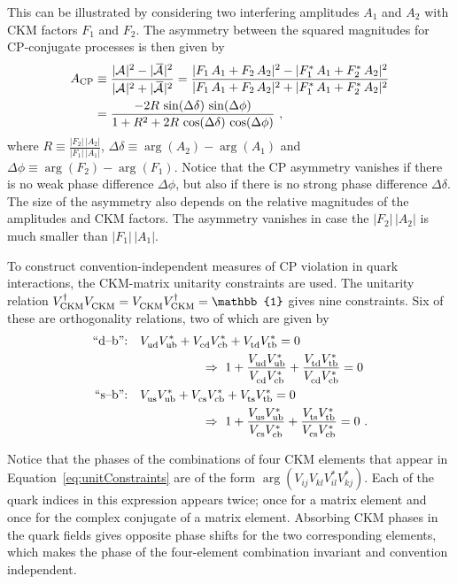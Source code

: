 This can be illustrated by considering two interfering amplitudes $A_1$ and $A_2$ with CKM factors $F_1$ and $F_2$. The asymmetry between
the squared magnitudes for CP-conjugate processes is then given by
\begin{equation}
  \label{eq:interference}
  \begin{split}
    A_\text{CP} &\equiv \frac{|\Af[]|^2 - |\Abarf[]|^2}{|\Af[]|^2 + |\Abarf[]|^2}
                 = \frac{|F_1\,A_1 + F_2\,A_2|^2 - |F_1^*\,A_1 + F_2^*\,A_2|^2}{|F_1\,A_1 + F_2\,A_2|^2 + |F_1^*\,A_1 + F_2^*\,A_2|^2} \\
                &= \frac{-2 R\, \sin(\Delta\delta)\, \sin(\Delta\phi)}{1 + R^2 + 2 R\, \cos(\Delta\delta)\, \cos(\Delta\phi)}
                   \ ,
  \end{split}
\end{equation}
where $R\equiv\frac{|F_2|\,|A_2|}{|F_1|\,|A_1|}$, $\Delta\delta\equiv\arg(A_2)-\arg(A_1)$ and $\Delta\phi\equiv\arg(F_2)-\arg(F_1)$. Notice
that the CP asymmetry vanishes if there is no weak phase difference $\Delta\phi$, but also if there is no strong phase difference
$\Delta\delta$. The size of the asymmetry also depends on the relative magnitudes of the amplitudes and CKM factors. The asymmetry vanishes
in case the $|F_2|\,|A_2|$ is much smaller than $|F_1|\,|A_1|$.

To construct convention-independent measures of CP violation in quark interactions, the CKM-matrix unitarity constraints are used. The
unitarity relation $\VCKM[\dagger]\VCKM = \VCKM\VCKM[\dagger] = \mathbb{1}$ gives nine constraints. Six of these are orthogonality
relations, two of which are given by
\begin{subequations}
  \label{eq:unitConstraints}
  \begin{align}
    \text{``d--b'':} & \quad \Vud\Vub[*] + \Vcd\Vcb[*] + \Vtd\Vtb[*] = 0 \nonumber \\
    \label{eq:unitConstraints_d}
    &\qquad\qquad\qquad \Rightarrow\ 1 + \frac{\Vud\Vub[*]}{\Vcd\Vcb[*]} + \frac{\Vtd\Vtb[*]}{\Vcd\Vcb[*]} = 0 \\
    \text{``s--b'':} & \quad \Vus\Vub[*] + \Vcs\Vcb[*] + \Vts\Vtb[*] = 0 \nonumber \\
    \label{eq:unitConstraints_s}
    &\qquad\qquad\qquad \Rightarrow\ 1 + \frac{\Vus\Vub[*]}{\Vcs\Vcb[*]} + \frac{\Vts\Vtb[*]}{\Vcs\Vcb[*]} = 0 \ .
  \end{align}
\end{subequations}

Notice that the phases of the combinations of four CKM elements that appear in Equation~\ref{eq:unitConstraints} are of the form $\arg(
V^{\phantom{*}}_{ij} V^{\phantom{*}}_{kl} V^{*}_{il} V^{*}_{kj} )$. Each of the quark indices in this expression appears twice; once for a
matrix element and once for the complex conjugate of a matrix element. Absorbing CKM phases in the quark fields gives opposite phase shifts
for the two corresponding elements, which makes the phase of the four-element combination invariant and convention independent.

